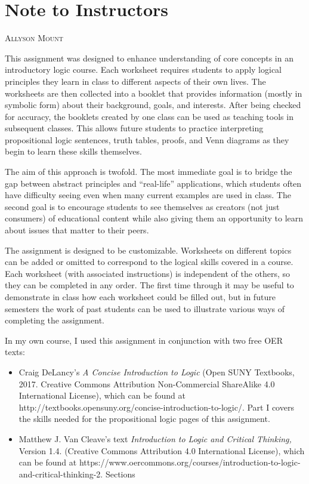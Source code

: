 \documentclass[oneside, openany]{book} %
\makeatletter
\newcommand\chapterauthor[1]{\authortoc{#1}\printchapterauthor{#1}}
\newcommand{\printchapterauthor}[1]{%
 {\parindent0pt\vspace*{-25pt}%
 \linespread{1.1}\large\scshape#1%
 \par\nobreak\vspace*{35pt}}
 \@afterheading%
}
\newcommand{\authortoc}[1]{%
 \addtocontents{toc}{\vskip-10pt}%
 \addtocontents{toc}{%
  \protect\contentsline{chapter}%
  {\hskip1.3em\mdseries\scshape\protect\scriptsize#1}{}{}}
 \addtocontents{toc}{\vskip5pt}%
}
\makeatother
\begin{document}
\pagebreak

\mainmatter

\chapter{Note to Instructors}

\chapterauthor{Allyson Mount}

This assignment was designed to enhance understanding of core concepts in an introductory logic course. Each worksheet requires students to apply logical principles they learn in class to 
different aspects of their own lives. The worksheets are then collected into a booklet that provides information (mostly in symbolic form) about their background, goals, and interests. 
After being checked for accuracy, the booklets created by one class can be used as teaching tools in subsequent classes. This allows future students to practice interpreting propositional 
logic sentences, truth tables, proofs, and Venn diagrams as they begin to learn these skills themselves.

The aim of this approach is twofold. The most immediate goal is to bridge the gap between abstract principles and ``real-life'' applications, which students often have difficulty seeing 
even when many current examples are used in class. The second goal is to encourage students to see themselves as creators (not just consumers) of educational content while also giving 
them an opportunity to learn about issues that matter to their peers.

The assignment is designed to be customizable. Worksheets on different topics can be added or omitted to correspond to the logical skills covered in a course. Each worksheet (with 
associated instructions) is independent of the others, so they can be completed in any order. The first time through it may be useful to demonstrate in class how each worksheet could be 
filled out, but in future semesters the work of past students can be used to illustrate various ways of completing the assignment.

In my own course, I used this assignment in conjunction with two free OER texts:

\begin{itemize}

\item Craig DeLancy's \textit{A Concise Introduction to Logic }(Open SUNY Textbooks, 2017. Creative Commons Attribution Non-Commercial ShareAlike 4.0 International License), which can be 
found at http://textbooks.opensuny.org/concise-introduction-to-logic/. Part I covers the skills needed for the propositional logic pages of this assignment.

\item Matthew J. Van Cleave's text \textit{Introduction to Logic and Critical Thinking, }Version 1.4. (Creative Commons Attribution 4.0 International License), which can be found at 
https://www.oercommons.org/courses/introduction-to-logic-and-critical-thinking-2. Sections

\end{itemize}
\end{document}

